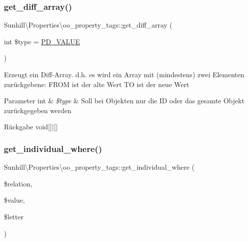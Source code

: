 \subsubsection{\texorpdfstring{get\+\_\+diff\+\_\+array()}{get\_diff\_array()}}
{\footnotesize\ttfamily Sunhill\textbackslash{}\+Properties\textbackslash{}oo\+\_\+property\+\_\+tags\+::get\+\_\+diff\+\_\+array (\begin{DoxyParamCaption}\item[{int}]{\$type = {\ttfamily \hyperlink{namespaceSunhill_1_1Properties_a28c3de9e20fd246123a2853f7055117d}{P\+D\+\_\+\+V\+A\+L\+UE}} }\end{DoxyParamCaption})}

Erzeugt ein Diff-\/\+Array. d.\+h. es wird ein Array mit (mindestens) zwei Elementen zurückgebene\+: F\+R\+OM ist der alte Wert TO ist der neue Wert 
\begin{DoxyParams}[1]{Parameter}
int & {\em \$type} & Soll bei Objekten nur die ID oder das gesamte Objekt zurückgegeben werden \\
\hline
\end{DoxyParams}
\begin{DoxyReturn}{Rückgabe}
void\mbox{[}\mbox{]}$\vert$\mbox{[}\mbox{]} 
\end{DoxyReturn}
\mbox{\label{classSunhill_1_1Properties_1_1oo__property__tags_ac83ba13a23bbcdd46244706b9e74471d}} 
\subsubsection{\texorpdfstring{get\+\_\+individual\+\_\+where()}{get\_individual\_where()}}
{\footnotesize\ttfamily Sunhill\textbackslash{}\+Properties\textbackslash{}oo\+\_\+property\+\_\+tags\+::get\+\_\+individual\+\_\+where (\begin{DoxyParamCaption}\item[{}]{\$relation,  }\item[{}]{\$value,  }\item[{}]{\$letter }\end{DoxyParamCaption})\hspace{0.3cm}{\ttfamily [protected]}}

